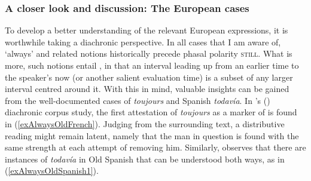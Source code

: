 \subsubsection{A closer look and discussion: The European cases} 
To develop a better understanding of the relevant European expressions, it is worthwhile taking a diachronic perspective. In all cases that I am aware of, \lq always' and related notions historically precede phasal polarity \textsc{still}. What is more, such notions entail  \parencite[149]{MosegaardHansen2008}, in that an interval leading up from an earlier time to the speaker's now (or another salient evaluation time) is a subset of any larger interval centred around it. With this in mind, valuable insights can be gained from the well-documented cases of  \textit{toujours} and Spanish \textit{todavía}. In \citeauthor{MosegaardHansen2008}'s (\citeyear{MosegaardHansen2008}) diachronic corpus study, the first attestation of \textit{toujours} as a marker of  is found in (\ref{exAlwaysOldFrench}). Judging from the surrounding text, a distributive reading might remain latent, namely that the man in question is found with the same strength at each attempt of removing him. Similarly, \textcite{Bosque2016} observes that there are instances of \textit{todavía} in Old Spanish that can be understood both ways, as in (\ref{exAlwaysOldSpanish1}).

